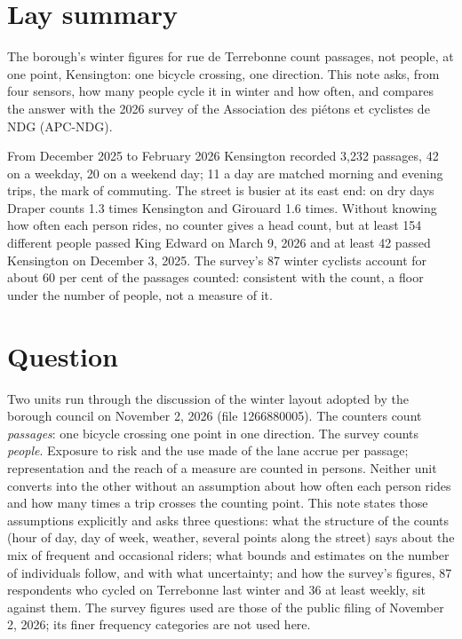\documentclass[11pt,a4paper]{article}
\begin{document}
\section*{Lay summary}
The borough\textquoteright{}s winter figures for rue de Terrebonne count passages, not people, at one point, Kensington: one bicycle crossing, one direction. This note asks, from four sensors, how many people cycle it in winter and how often, and compares the answer with the 2026 survey of the Association des piétons et cyclistes de NDG (APC-NDG).

From December 2025 to February 2026 Kensington recorded 3,232 passages, 42 on a weekday, 20 on a weekend day; 11 a day are matched morning and evening trips, the mark of commuting. The street is busier at its east end: on dry days Draper counts 1.3 times Kensington and Girouard 1.6 times. Without knowing how often each person rides, no counter gives a head count, but at least 154 different people passed King Edward on March 9, 2026 and at least 42 passed Kensington on December 3, 2025. The survey\textquoteright{}s 87 winter cyclists account for about 60 per cent of the passages counted: consistent with the count, a floor under the number of people, not a measure of it.

\tableofcontents

\section{Question}
Two units run through the discussion of the winter layout adopted by the borough council on November 2, 2026 (file 1266880005). The counters count \emph{passages}: one bicycle crossing one point in one direction. The survey counts \emph{people}. Exposure to risk and the use made of the lane accrue per passage; representation and the reach of a measure are counted in persons. Neither unit converts into the other without an assumption about how often each person rides and how many times a trip crosses the counting point. This note states those assumptions explicitly and asks three questions: what the structure of the counts (hour of day, day of week, weather, several points along the street) says about the mix of frequent and occasional riders; what bounds and estimates on the number of individuals follow, and with what uncertainty; and how the survey\textquoteright{}s figures, 87 respondents who cycled on Terrebonne last winter and 36 at least weekly, sit against them. The survey figures used are those of the public filing of November 2, 2026; its finer frequency categories are not used here.
\end{document}
